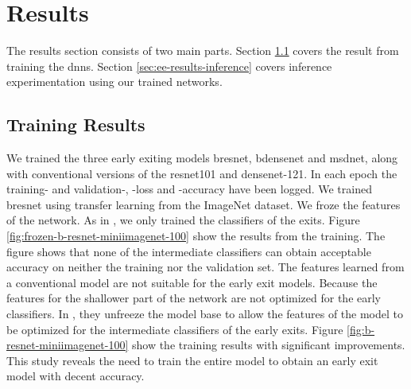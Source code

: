 \section{Results} \label{sec:ee-results}

The results section consists of two main parts. Section \ref{sec:ee-results-training} covers the result from training the \gls{dnn}s. Section \ref{sec:ee-results-inference} covers inference experimentation using our trained networks. 

\subsection{Training Results} \label{sec:ee-results-training}
We trained the three early exiting models \gls{bresnet}, \gls{bdensenet} and \gls{msdnet}, along with conventional versions of the \gls{resnet}101 and \gls{densenet}-121. In each epoch the training- and validation-, -loss and -accuracy have been logged.
We trained \gls{bresnet} using transfer learning from the ImageNet dataset. We froze the features of the network. As in \cite{leroux_resource-constrained_2015}, we only trained the classifiers of the exits. Figure \ref{fig:frozen-b-resnet-miniimagenet-100} show the results from the training. The figure shows that none of the intermediate classifiers can obtain acceptable accuracy on neither the training nor the validation set. The features learned from a conventional model are not suitable for the early exit models. Because the features for the shallower part of the network are not optimized for the early classifiers. In \cite{teerapittayanon_branchynet:_2016}, they unfreeze the model base to allow the features of the model to be optimized for the intermediate classifiers of the early exits. Figure \ref{fig:b-resnet-miniimagenet-100} show the training results with significant improvements. This study reveals the need to train the entire model to obtain an early exit model with decent accuracy.
